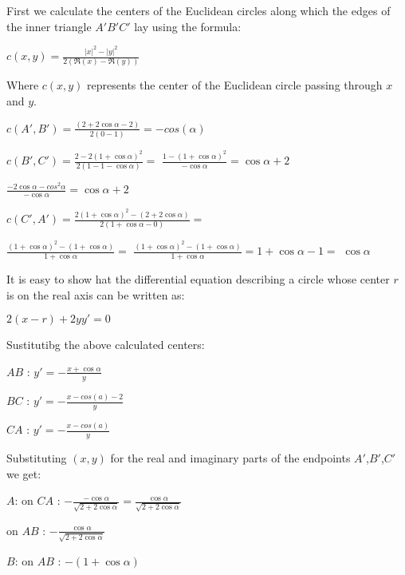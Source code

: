 \documentclass[a4paper,10pt]{article}
\begin{document}
First we calculate the centers of the Euclidean circles along which the edges
of the inner triangle $A'B'C'$ lay using the formula:

\begin{center}
  $c\left(x,y\right) = \frac{\left|x\right|^{2} - \left|y\right|^{2}}{2\left(\Re(x) - \Re(y)\right)} $
\end{center}

Where $c\left(x,y\right)$ represents the center of the Euclidean circle passing
through $x$ and $y$.

  $c\left(A',B'\right) = \frac{\left(2 + 2\cos{\alpha} - 2\right)}{{2\left(0 - 1\right)}} = -cos(\alpha) $

  $c\left(B',C'\right) = \frac{2 - 2\left(1 + \cos{\alpha}\right)^2}{2\left(1 - 1 - \cos{\alpha}\right)} = $
  $ \frac{1 - \left(1 + \cos{\alpha}\right)^2}{-\cos{\alpha}} = \cos{\alpha} + 2$

  $ \frac{-2\cos{\alpha} - cos^{2}{\alpha}}{-\cos{\alpha}} = \cos{\alpha} + 2$

  $c\left(C',A'\right) = \frac{2\left(1 + \cos{\alpha} \right)^2 - \left(2 + 2\cos{\alpha}\right)}{2\left(1+\cos{\alpha} - 0\right)} =$

  $\frac{\left(1 + \cos{\alpha} \right)^2 - \left(1 + \cos{\alpha}\right)}{1+\cos{\alpha}} =$
  $\frac{\left(1 + \cos{\alpha} \right)^2 - \left(1 + \cos{\alpha}\right)}{1+\cos{\alpha}} = 1 + \cos{\alpha} - 1 = $
  $\cos{\alpha}$

It is easy to show hat the differential equation describing a circle whose center
$r$ is on the real axis can be written as:

$2\left(x-r\right)+2yy'=0$

Sustitutibg the above calculated centers:
  
\noindent $AB$ :  $y' = -\frac{x + \cos{\alpha}}{ y} $

\noindent $BC$ :  $y' = -\frac{x - cos\left(a\right) - 2}{y}$

\noindent $CA$ :  $y' = -\frac{x - cos\left(a\right)}{y}$


Substituting $(x,y)$ for the real and imaginary parts of the endpoints $A'$,$B'$,$C'$ we get:

\noindent $A$: 
on $CA$ : $-\frac{-\cos{\alpha}}{\sqrt{2 + 2 \cos{\alpha}}} = \frac{\cos{\alpha}}{\sqrt{2 + 2 \cos{\alpha}}}$

on $AB$ : $-\frac{\cos{\alpha}}{\sqrt{2 + 2 \cos{\alpha}}}$

\noindent $B$: 
on $AB$ : $-\left(1 + \cos{\alpha}\right)$
\end{document}
